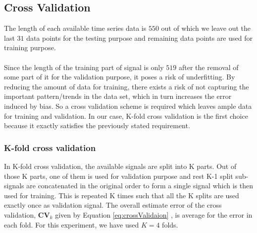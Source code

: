 
\subsection{Cross Validation}
\indent \indent
	The length of each available time series data is $550$ out of which we leave out the last $31$ data points for the testing purpose and remaining data points are used for training purpose.\\
	\\
Since the length of the training part of signal is only $519$ after the removal of some part of it for the validation purpose, it poses a risk of underfitting.  By reducing the amount of data for training, there exists a risk of not capturing the important pattern/trends in the data set, which in turn increases the error induced by bias. So a cross validation scheme is required which leaves ample data for training and validation. In our case, K-fold cross validation is the first choice because it exactly satisfies the previously stated requirement.


\subsubsection{K-fold cross validation}
\label{kfold}
    
In K-fold cross validation, the available signals are split into K parts. Out of those K parts, one of them is used for validation purpose and rest K-1 split sub-signals are concatenated in the original order to form a single signal which is then used for training. This is repeated K times such that all the K splits are used exactly once as validation signal. The overall estimate  error of the cross validation, $\mathbf{CV}_k$ given by Equation \eqref{eq:crossValidaion} , is average for the error in each fold. For this experiment, we  have used $K=4$ folds.
 
